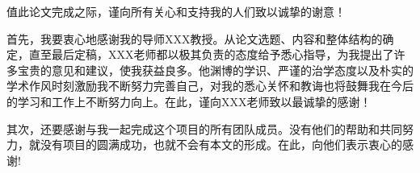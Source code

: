\begin{acknowledge}
  值此论文完成之际，谨向所有关心和支持我的人们致以诚挚的谢意！

  首先，我要衷心地感谢我的导师XXX教授。从论文选题、内容和整体结构的确定，直至最后定稿，XXX老师都以极其负责的态度给予悉心指导，为我提出了许多宝贵的意见和建议，使我获益良多。他渊博的学识、严谨的治学态度以及朴实的学术作风时刻激励我不断努力完善自己，对我的悉心关怀和教诲也将鼓舞我在今后的学习和工作上不断努力向上。在此，谨向XXX老师致以最诚挚的感谢！

  其次，还要感谢与我一起完成这个项目的所有团队成员。没有他们的帮助和共同努力，就没有项目的圆满成功，也就不会有本文的形成。在此，向他们表示衷心的感谢!
\end{acknowledge}